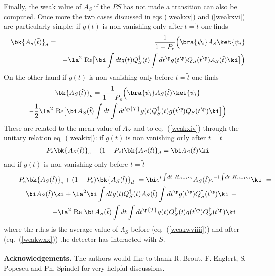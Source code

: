 \documentclass[12pt]{article}
\begin{document}
Finally, the weak value of $A_S$ if the $PS$ has not made a
transition can also be computed.
Once more the two cases discussed in eqs (\ref{weakxv}) and (\ref{weakxvi})
are particularly simple: if $g(t)$ is non vanishing only after $t=\tilde t$ one
finds \begin{eqnarray}
\bk{A_{S}(\tilde t)}_{d} &=&{1 \over 1 - P_{e}  }\Bigl(
\bra{\psi_i}A_S\ket{\psi_i} \nonumber\\
& &-\la^2 \mbox{ Re}  \bigl[
\bi \int dt g(t) Q_S^\dagger (t)
 \int dt^\p g(t^\p) Q_S(t^\p)  A_S(\tilde t) \ki\bigr]\Bigr)
\label{weakxvii}
\end{eqnarray}
On the other hand if $g(t)$ is non vanishing only before $t=\tilde t$ one finds
\begin{multline}
\bk{A_{S}(\tilde t)}_{d} = {1 \over 1 - P_{e}  }\Bigl(
\bra{\psi_i}A_S(\tilde t)\ket{\psi_i} \\
 -{1 \over 2} \la^2 \mbox{ Re} \bigl[
\bi A_S(\tilde t) \int dt
 \int dt^\p {\cal T} g(t) Q_S^\dagger (t) g(t^\p) Q_S(t^\p)   \ki\bigr]
\Bigr)\label{weakxviii}
 \end{multline}
These are related to the mean value of $A_S$
and to eq.~(\ref{weakxiv}) through the unitary relation eq.~(\ref{weakix}):
if $g(t)$ is non vanishing only after $t=\tilde t$
\begin{eqnarray}
 P_{e}\bk{A_{S}(\tilde t)}_{e}
+ (1 - P_{e} )
\bk{A_{S}(\tilde t)}_{d} = \bi A_S(\tilde t) \ki \label{weakwviiii}
\end{eqnarray}
and if $g(t)$ is non vanishing only before $t=\tilde t$
\begin{eqnarray}
\lefteqn{ P_{e}\bk{A_{S}(\tilde t)}_{e}
+ (1 - P_{e} )\bk{A_{S}(\tilde t)}_{d} \ =
\bi e^{i\int \! dt \ H_{S-PS}}
A_S (\tilde t)
e^{-i\int \! dt \ H_{S-PS}}
\ki
\ =}
\nonumber\\
& &\bi A_S(\tilde t) \ki
  +\la^2
\bi \int dt g(t) Q_S^\dagger (t) A_S(\tilde t)
\int dt^\p g(t^\p) Q_S^\dagger (t^\p)\ki \ -\nonumber\\
& &  -\la^2 \mbox{ Re } \bi A_S(\tilde t) \int dt
\int dt^\p {\cal T} g(t) Q_S^\dagger (t) g(t^\p) Q_S^\dagger (t^\p)\ki
\label{weakwxx}
\end{eqnarray}
where the r.h.s is the average value of $A_S$ before
(eq.~(\ref{weakwviiii})) and after (eq.~(\ref{weakwxx})) the detector
has interacted with $S$.
\\
\\
{\bf Acknowledgements.}
\noindent The authors would like to thank R. Brout,
F. Englert, S. Popescu and Ph. Spindel for very helpful
discussions.
\end{document}
